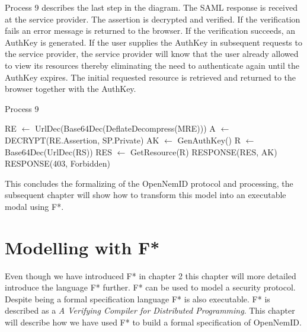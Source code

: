 \documentclass[twosided]{report}
\begin{document}
Process 9 describes the last step in the diagram. The SAML response is received at the service provider. The assertion is decrypted and verified. If the verification fails an error message is returned to the browser. If the verification succeeds, an AuthKey is generated. If the user supplies the AuthKey in subsequent requests to the service provider, the service provider will know that the user already allowed to view its resources thereby eliminating the need to authenticate again until the AuthKey expires. The initial requested resource is retrieved and returned to the browser together with the AuthKey.
\begin{algorithm}[H]
	\caption{Process 9}
	\begin{algorithmic}
		\STATE RE $\leftarrow$ UrlDec(Base64Dec(DeflateDecompress(MRE)))
		\STATE A $\leftarrow$ DECRYPT(RE.Assertion, SP.Private)
			\STATE AK $\leftarrow$ GenAuthKey()
			\STATE R $\leftarrow$ Base64Dec(UrlDec(RS))
			\STATE RES $\leftarrow$ GetResource(R)
			\RETURN RESPONSE(RES, AK)
		\ELSE
			\RETURN RESPONSE(403, Forbidden)
		\ENDIF
	\end{algorithmic}
\end{algorithm}

This concludes the formalizing of the OpenNemID protocol and processing, the subsequent chapter will show how to transform this model into an executable modal using F*.

\chapter{Modelling with F*}
Even though we have introduced F* in chapter 2 this chapter will more detailed introduce the language F* further. F* can be used to model a security protocol. Despite being a formal specification language F* is also executable. F* is described as a \emph{A Verifying Compiler for Distributed Programming}. This chapter will describe how we have used F* to build a formal specification of OpenNemID.
\end{document}
